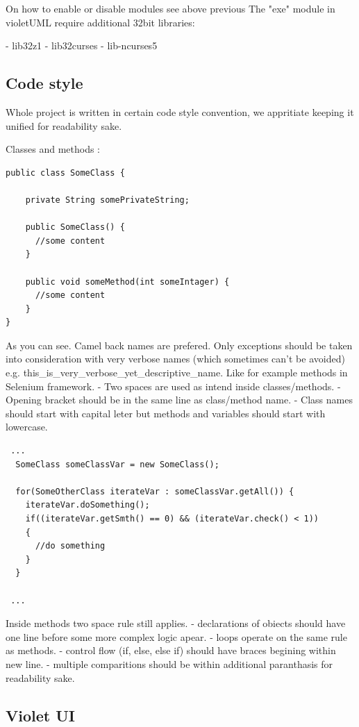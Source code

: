 \documentclass{article}
\begin{document}
On how to enable or disable modules see above previous
The "exe" module in violetUML require additional 32bit libraries:

- lib32z1
- lib32curses
- lib-ncurses5

\subsection{Code style}

Whole project is written in certain code style convention, we appritiate keeping it unified for readability sake.

Classes and methods :
\begin{lstlisting}
public class SomeClass {

    private String somePrivateString;

    public SomeClass() {
      //some content
    }

    public void someMethod(int someIntager) {
      //some content
    }
}
\end{lstlisting}

As you can see. Camel back names are prefered. Only exceptions should be taken into consideration with very verbose names (which sometimes
can't be avoided) e.g. this\_is\_very\_verbose\_yet\_descriptive\_name. Like for example methods in Selenium framework.
- Two spaces are used as intend inside classes/methods.
- Opening bracket should be in the same line as class/method name.
- Class names should start with capital leter but methods and variables should start with lowercase.

\begin{lstlisting}
 ...
  SomeClass someClassVar = new SomeClass();
  
  for(SomeOtherClass iterateVar : someClassVar.getAll()) {
    iterateVar.doSomething();
    if((iterateVar.getSmth() == 0) && (iterateVar.check() < 1))
    {
      //do something
    }
  }
  
 ...
\end{lstlisting}

Inside methods two space rule still applies.
- declarations of obiects should have one line before some more complex logic apear.
- loops operate on the same rule as methods.
- control flow (if, else, else if) should have braces begining within new line.
- multiple comparitions should be within additional paranthasis for readability sake.

\subsection{Violet UI}
\end{document}
